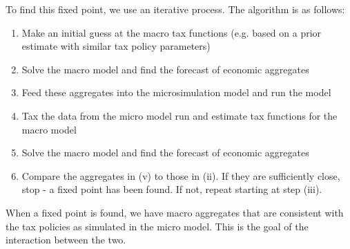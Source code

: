 \documentclass[letterpaper,11pt]{article}
\theoremstyle{definition}
\begin{document}
To find this fixed point, we use an iterative process.  The algorithm is as follows:
\begin{enumerate}
\item Make an initial guess at the macro tax functions (e.g. based on a prior estimate with similar tax policy parameters)
\item Solve the macro model and find the forecast of economic aggregates
\item Feed these aggregates into the microsimulation model and run the model
\item Tax the data from the micro model run and estimate tax functions for the macro model
\item Solve the macro model and find the forecast of economic aggregates
\item Compare the aggregates in (v) to those in (ii).  If they are sufficiently close, stop - a fixed point has been found.  If not, repeat starting at step (iii).
\end{enumerate}

When a fixed point is found, we have macro aggregates that are consistent with the tax policies as simulated in the micro model.  This is the goal of the interaction between the two.
\end{document}
